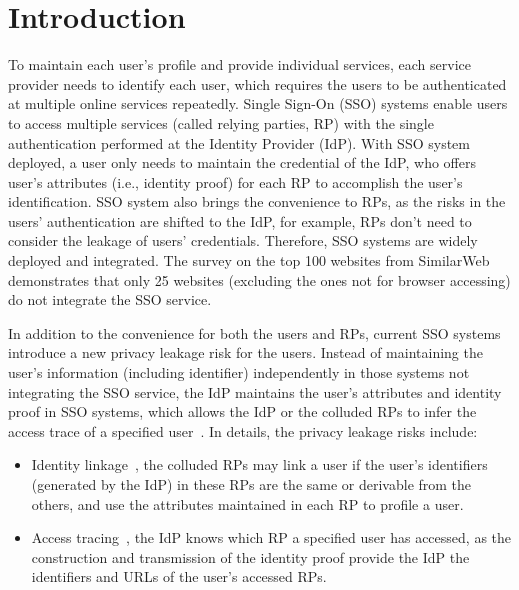 \section{Introduction}
\label{sec:intro}


To maintain each user's profile and provide individual services, each service provider needs to identify each user, which requires the users to be authenticated at multiple online services repeatedly.
Single Sign-On (SSO) systems enable users to access multiple services (called relying parties, RP) with the single authentication performed at the Identity Provider (IdP). With SSO system deployed, a user only needs to maintain the credential of the IdP, who offers user's attributes (i.e., identity proof) for each RP to accomplish the user's identification.
SSO system also brings the convenience to RPs, as the risks in the users' authentication are shifted to the IdP, for example, RPs don't need to consider the leakage of users' credentials.
Therefore, SSO systems are widely deployed and integrated.
The survey on the top 100 websites from SimilarWeb~\cite{similarweb} demonstrates that only 25 websites (excluding the ones not for browser accessing) do not integrate the SSO service.

In addition to the convenience for both the users and RPs, current SSO systems introduce a new privacy leakage risk for the users.
Instead of maintaining the user's information (including identifier) independently in those systems not integrating the SSO service,  the IdP maintains the user's attributes  and identity proof in SSO systems, which allows the IdP or the colluded RPs to infer the access trace of a specified user~\cite{NIST}. In details, the privacy leakage risks include:
\begin{itemize}
\item Identity linkage~\cite{SAMLIdentifier,OpenIDConnect,NIST2017draft}, the colluded RPs may link a user if the user's identifiers (generated by the IdP) in these RPs are the same or derivable from the others, and use the attributes maintained in each RP to profile a user.
\item Access tracing~\cite{NIST2017draft,persona,SPRESSO}, the IdP knows which RP a specified user has accessed, as the construction and transmission of the identity proof provide the IdP the identifiers and URLs of the user's accessed RPs.
\end{itemize}


